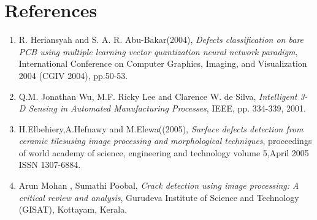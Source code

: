 \documentclass[12pt]{article}
\begin{document}
\section{References}
\begin{enumerate}
\item{R. Heriansyah and S. A. R. Abu-Bakar(2004), \emph{Defects classification on bare PCB using multiple learning vector quantization neural network paradigm}, International Conference on Computer Graphics, Imaging, and Visualization 2004 (CGIV 2004), pp.50-53.}
\item{Q.M. Jonathan Wu, M.F. Ricky Lee and Clarence W. de Silva,
\emph{Intelligent 3-D Sensing in Automated Manufacturing Processes}, IEEE, pp. 334-339, 2001.}
\item{H.Elbehiery,A.Hefnawy and M.Elewa((2005), \emph{Surface defects detection from ceramic tilesusing image processing and morphological techniques}, proceedings of world academy of science, engineering and technology volume 5,April 2005 ISSN 1307-6884.}
\item{Arun Mohan , Sumathi Poobal, \emph{Crack detection using image processing: A critical review and analysis}, Gurudeva Institute of Science and Technology (GISAT), Kottayam, Kerala.
}
\end{enumerate}
\end{document}
